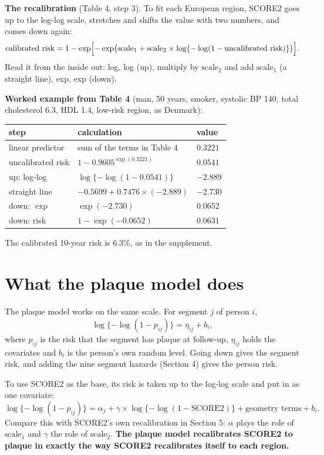 \documentclass[11pt]{article}
\newcommand{\up}{\textcolor{blue!70!black}}
\newcommand{\down}{\textcolor{red!70!black}}
\begin{document}
\textbf{The recalibration} (Table 4, step 3). To fit each European region, SCORE2 goes up to
the log-log scale, stretches and shifts the value with two numbers, and comes down again:
\[
  \text{calibrated risk} = 1 - \exp\Bigl[-\exp\bigl(\text{scale}_1 + \text{scale}_2 \times
  \log\{-\log(1 - \text{uncalibrated risk})\}\bigr)\Bigr].
\]
Read it from the inside out: \up{log, log} (up), multiply by $\text{scale}_2$ and add
$\text{scale}_1$ (a straight line), \down{exp, exp} (down).

\textbf{Worked example from Table 4} (man, 50 years, smoker, systolic BP 140, total cholesterol
6.3, HDL 1.4, low-risk region, as Denmark):
\begin{center}
\begin{tabular}{lll}
\toprule
step & calculation & value \\
\midrule
linear predictor & sum of the terms in Table 4 & $0.3221$ \\
uncalibrated risk & $1 - 0.9605^{\exp(0.3221)}$ & $0.0541$ \\
\up{up}: log-log & $\log\{-\log(1-0.0541)\}$ & $-2.889$ \\
straight line & $-0.5699 + 0.7476 \times (-2.889)$ & $-2.730$ \\
\down{down}: $\exp$ & $\exp(-2.730)$ & $0.0652$ \\
\down{down}: risk & $1 - \exp(-0.0652)$ & $0.0631$ \\
\bottomrule
\end{tabular}
\end{center}
The calibrated 10-year risk is 6.3\%, as in the supplement.

\section{What the plaque model does}

The plaque model works on the same scale. For segment $j$ of person $i$,
\[
  \log\{-\log(1 - p_{ij})\} = \eta_{ij} + b_i ,
\]
where $p_{ij}$ is the risk that the segment has plaque at follow-up, $\eta_{ij}$ holds the
covariates and $b_i$ is the person's own random level. Going \down{down} gives the segment
risk, and adding the nine segment hazards (Section 4) gives the person risk.

To use SCORE2 as the base, its risk is taken \up{up} to the log-log scale and put in as one
covariate:
\[
  \log\{-\log(1 - p_{ij})\} = \alpha_j + \gamma \times \log\{-\log(1 - \text{SCORE2})\}
  + \text{geometry terms} + b_i .
\]
Compare this with SCORE2's own recalibration in Section 5:
$\alpha$ plays the role of $\text{scale}_1$ and $\gamma$ the role of $\text{scale}_2$.
\textbf{The plaque model recalibrates SCORE2 to plaque in exactly the way SCORE2 recalibrates
itself to each region.}
\end{document}
